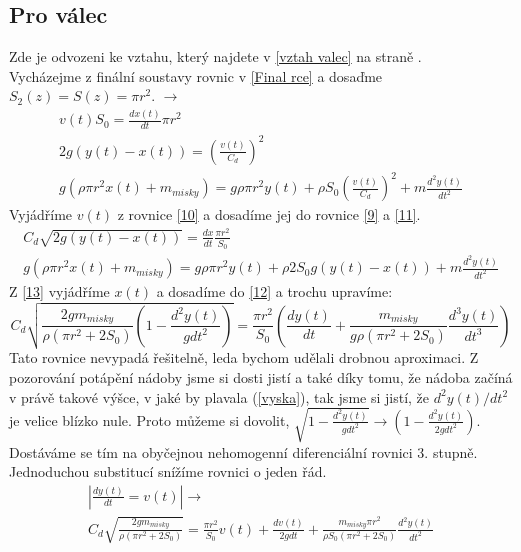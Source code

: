 \documentclass[14pt,a4paper]{article}
\begin{document}
\subsection{Pro válec}
\label{rovnice valec}
Zde je odvozeni ke vztahu, který najdete v \ref{vztah valec} na straně \pageref{vztah valec}.\\
Vycházejme z finální soustavy rovnic v \ref{Final rce} a dosaďme $S_2(z)=S(z)=\pi r^2$. \quad $\rightarrow$
\begin{gather} 
\label{9}
v(t)S_0=\frac{dx(t)}{dt}\pi r^2\\
\label{10}
2g(y(t)-x(t))=\left(\frac{v(t)}{C_d}\right)^2\\
\label{11}
g\left(\rho\pi r^2x(t)+m_{misky}\right)=g \rho \pi r^2y(t)+\rho S_0\left(\frac{v(t)}{C_d}\right)^2+m \frac{d^2y(t)}{dt^2}
\end{gather}
Vyjádříme $v(t)$ z rovnice \ref{10} a dosadíme jej do rovnice \ref{9} a \ref{11}.
\begin{gather}
\label{12}
C_d\sqrt{2g(y(t)-x(t))}=\frac{dx}{dt}\frac{\pi r^2}{S_0}\\
\label{13}
g\left(\rho\pi r^2x(t)+m_{misky}\right)=g \rho \pi r^2y(t)+\rho 2S_0g(y(t)-x(t))+m \frac{d^2y(t)}{dt^2}
\end{gather}
Z \ref{13} vyjádříme $x(t)$ a dosadíme do \ref{12} a trochu upravíme:
\begin{equation}
C_d\sqrt{\frac{2gm_{misky}}{\rho \left(\pi r^{2}+2S_0\right)}\left(1-\frac{d^{2}y(t)}{gdt^{2}}\right)}=\frac{\pi r^2}{S_0}\left(\frac{dy(t)}{dt}+\frac{m_{misky}}{g\rho (\pi r^{2}+2S_0)}\frac{d^3y(t)}{dt^3}\right)
\end{equation}
Tato rovnice nevypadá řešitelně, leda bychom udělali drobnou aproximaci. Z pozorování potápění nádoby jsme si dosti jistí a také díky tomu, že nádoba začíná v právě takové výšce, v jaké by plavala (\ref{vyska}), tak jsme si jistí, že $d^{2}y(t)/dt^{2}$ je velice blízko nule. Proto můžeme si dovolit, $\sqrt{1-\frac{d^{2}y(t)}{gdt^{2}}} \rightarrow \left(1-\frac{d^{2}y(t)}{2gdt^{2}}\right)$. Dostáváme se tím na obyčejnou nehomogenní diferenciální rovnici 3. stupně. Jednoduchou substitucí snížíme rovnici o jeden řád.
\begin{gather}
\label{15}
\left| \frac{dy(t)}{dt}=v(t)\right| \rightarrow\\
\label{16}
C_d\sqrt{\frac{2gm_{misky}}{\rho \left(\pi r^{2}+2S_0\right)}}=\frac{\pi r^2}{S_0}v(t)+\frac{dv(t)}{2gdt}+\frac{m_{misky}\pi r^2}{\rho S_0(\pi r^{2}+2S_0)}\frac{d^{2}y(t)}{dt^{2}}
\end{gather}
\end{document}
